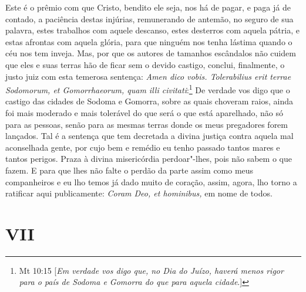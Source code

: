 Este é o prêmio com que Cristo, bendito ele seja, nos há de pagar, e
paga já de contado, a paciência destas injúrias, remunerando de antemão,
no seguro de sua palavra, estes trabalhos com aquele descanso, estes
desterros com aquela pátria, e estas afrontas com aquela glória, para
que ninguém nos tenha lástima quando o céu nos tem inveja. Mas, por que
os autores de tamanhos escândalos não cuidem que eles e suas terras hão
de ficar sem o devido castigo, conclui, finalmente, o justo juiz com
esta temerosa sentença: \emph{Amen dico vobis. Tolerabilius erit terrae
Sodomorum, et Gomorrhaeorum, quam illi civitati}:\footnote{Mt 10:15 [\emph{Em verdade vos digo que, no Dia do Juízo, haverá menos rigor para o país de Sodoma
e Gomorra do que para aquela cidade}.]} De verdade
vos digo que o castigo das cidades de Sodoma e Gomorra, sobre as quais
choveram raios, ainda foi mais moderado e mais tolerável do que será o
que está aparelhado, não só para as pessoas, senão para as mesmas terras
donde os meus pregadores forem lançados. Tal é a sentença que tem
decretada a divina justiça contra aquela mal aconselhada gente, por cujo
bem e remédio eu tenho passado tantos mares e tantos perigos. Praza à
divina misericórdia perdoar"-lhes, pois não sabem o que fazem. E para que
lhes não falte o perdão da parte assim como meus companheiros e eu lho
temos já dado muito de coração, assim, agora, lho torno a ratificar aqui
publicamente: \emph{Coram Deo, et hominibus,} em nome de todos.

\section*{VII}

